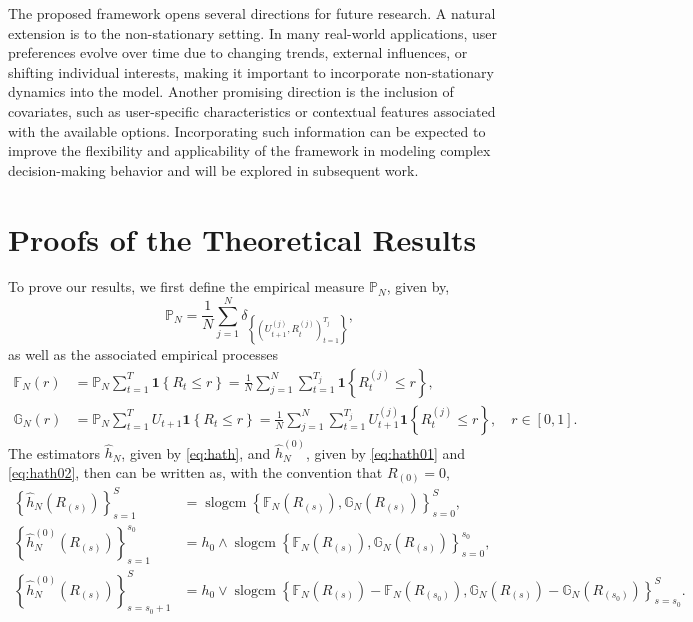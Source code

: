 \documentclass[12pt]{amsart}
\theoremstyle{plain}
\theoremstyle{remark}
\numberwithin{equation}{section}
\begin{document}
The proposed framework opens several directions for future research. A natural extension is to the non-stationary setting. In many real-world applications, user preferences evolve over time due to changing trends, external influences, or shifting individual interests, making it important to incorporate non-stationary dynamics into the model. Another promising direction is the inclusion of covariates, such as user-specific characteristics or contextual features associated with the available options. Incorporating such information can be expected to improve the flexibility and applicability of the framework in modeling complex decision-making behavior and will be explored in subsequent work.

\section{Proofs of the Theoretical Results}\label{sec6}
To prove our results, we first define the empirical measure $\mathbb{P}_N$, given by,
\[
    \mathbb{P}_N =  \frac{1}{N}\sum_{j=1}^N\delta_{\left\{\left(U^{(j)}_{t+1},R^{(j)}_{t}\right)_{t=1}^{T_j}\right\}},
\]
as well as the associated empirical processes
\begin{align*}
    \mathbb{F}_N(r) &= \mathbb{P}_N \sum_{t=1}^{T} \mathbf{1}\left\{R_t \leq r\right\}= \frac{1}{N}\sum_{j=1}^N\sum_{t=1}^{T_j}\mathbf{1}\left\{R^{(j)}_{t} \leq r\right\}, \\ \mathbb{G}_N(r) &= \mathbb{P}_N\sum_{t=1}^{T} U_{t+1} \mathbf{1}\left\{R_t \leq r\right\} =\frac{1}{N}\sum_{j=1}^N\sum_{t=1}^{T_j}U^{(j)}_{t+1}\mathbf{1}\left\{R^{(j)}_{t} \leq r\right\}, \quad r \in [0,1].
\end{align*}
The estimators $\hat{h}_N$, given by \eqref{eq:hath}, and $\hat{h}^{(0)}_N$, given by \eqref{eq:hath01} and \eqref{eq:hath02}, then can be written as, with the convention that $R_{(0)} = 0$,
\begin{align}\label{eq:hfg}
    \left\{\hat{h}_N\left(R_{(s)}\right)\right\}_{s = 1}^{S} &= \operatorname{slogcm}\left\{\mathbb{F}_N\left(R_{(s)}\right), \mathbb{G}_N\left(R_{(s)}\right)\right\}_{s = 0}^{S}, \nonumber\\
    \left\{\hat{h}^{(0)}_N\left(R_{(s)}\right)\right\}_{s = 1}^{s_0} &= h_0  \wedge \operatorname{slogcm}\left\{\mathbb{F}_N\left(R_{(s)}\right), \mathbb{G}_N\left(R_{(s)}\right)\right\}_{s = 0}^{s_0}, \\ \left\{\hat{h}^{(0)}_N\left(R_{(s)}\right)\right\}_{s = s_0+1}^{S} &= h_0 \vee \operatorname{slogcm}\left\{\mathbb{F}_N\left(R_{(s)}\right) - \mathbb{F}_N\left(R_{(s_0)}\right), \mathbb{G}_N\left(R_{(s)}\right) - \mathbb{G}_N\left(R_{(s_0)}\right)\right\}_{s = s_0}^{S}.\nonumber
\end{align}
\end{document}
